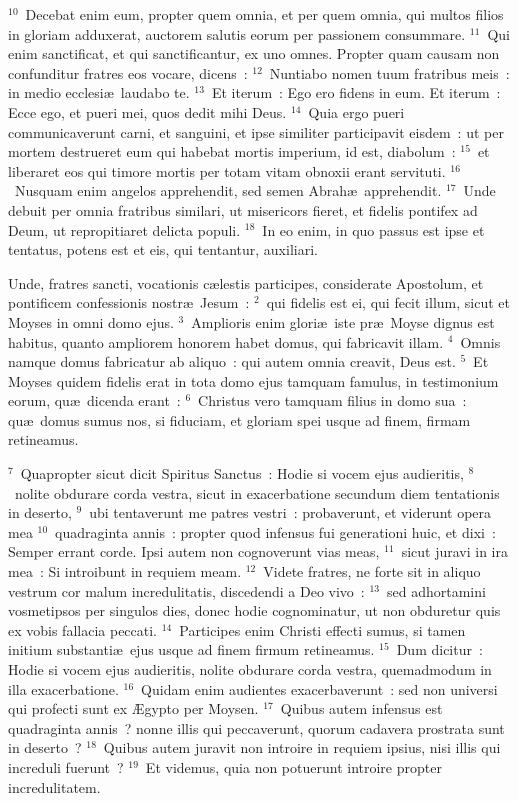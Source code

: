 ${}^{10}$~Decebat enim eum, propter quem omnia, et per quem omnia, qui multos filios in gloriam adduxerat, auctorem salutis eorum per passionem consummare.
${}^{11}$~Qui enim sanctificat, et qui sanctificantur, ex uno omnes. Propter quam causam non confunditur fratres eos vocare, dicens~:
${}^{12}$~Nuntiabo nomen tuum fratribus meis~: in medio ecclesi\ae\ laudabo te.
${}^{13}$~Et iterum~: Ego ero fidens in eum. Et iterum~: Ecce ego, et pueri mei, quos dedit mihi Deus.
${}^{14}$~Quia ergo pueri communicaverunt carni, et sanguini, et ipse similiter participavit eisdem~: ut per mortem destrueret eum qui habebat mortis imperium, id est, diabolum~:
${}^{15}$~et liberaret eos qui timore mortis per totam vitam obnoxii erant servituti.
${}^{16}$~Nusquam enim angelos apprehendit, sed semen Abrah\ae\ apprehendit.
${}^{17}$~Unde debuit per omnia fratribus similari, ut misericors fieret, et fidelis pontifex ad Deum, ut repropitiaret delicta populi.
${}^{18}$~In eo enim, in quo passus est ipse et tentatus, potens est et eis, qui tentantur, auxiliari.

\bchapter
\lettrine[lines=3,image=true,loversize=0.05,lraise=-0.03]{U}{}nde, fratres sancti, vocationis c\ae lestis participes, considerate Apostolum, et pontificem confessionis nostr\ae\ Jesum~:
${}^{2}$~qui fidelis est ei, qui fecit illum, sicut et Moyses in omni domo ejus.
${}^{3}$~Amplioris enim glori\ae\ iste pr\ae\ Moyse dignus est habitus, quanto ampliorem honorem habet domus, qui fabricavit illam.
${}^{4}$~Omnis namque domus fabricatur ab aliquo~: qui autem omnia creavit, Deus est.
${}^{5}$~Et Moyses quidem fidelis erat in tota domo ejus tamquam famulus, in testimonium eorum, qu\ae\ dicenda erant~:
${}^{6}$~Christus vero tamquam filius in domo sua~: qu\ae\ domus sumus nos, si fiduciam, et gloriam spei usque ad finem, firmam retineamus.


${}^{7}$~Quapropter sicut dicit Spiritus Sanctus~: Hodie si vocem ejus audieritis,
${}^{8}$~nolite obdurare corda vestra, sicut in exacerbatione secundum diem tentationis in deserto,
${}^{9}$~ubi tentaverunt me patres vestri~: probaverunt, et viderunt opera mea
${}^{10}$~quadraginta annis~: propter quod infensus fui generationi huic, et dixi~: Semper errant corde. Ipsi autem non cognoverunt vias meas,
${}^{11}$~sicut juravi in ira mea~: Si introibunt in requiem meam.
${}^{12}$~Videte fratres, ne forte sit in aliquo vestrum cor malum incredulitatis, discedendi a Deo vivo~:
${}^{13}$~sed adhortamini vosmetipsos per singulos dies, donec hodie cognominatur, ut non obduretur quis ex vobis fallacia peccati.
${}^{14}$~Participes enim Christi effecti sumus, si tamen initium substanti\ae\ ejus usque ad finem firmum retineamus.
${}^{15}$~Dum dicitur~: Hodie si vocem ejus audieritis, nolite obdurare corda vestra, quemadmodum in illa exacerbatione.
${}^{16}$~Quidam enim audientes exacerbaverunt~: sed non universi qui profecti sunt ex \AE gypto per Moysen.
${}^{17}$~Quibus autem infensus est quadraginta annis~? nonne illis qui peccaverunt, quorum cadavera prostrata sunt in deserto~?
${}^{18}$~Quibus autem juravit non introire in requiem ipsius, nisi illis qui increduli fuerunt~?
${}^{19}$~Et videmus, quia non potuerunt introire propter incredulitatem.

